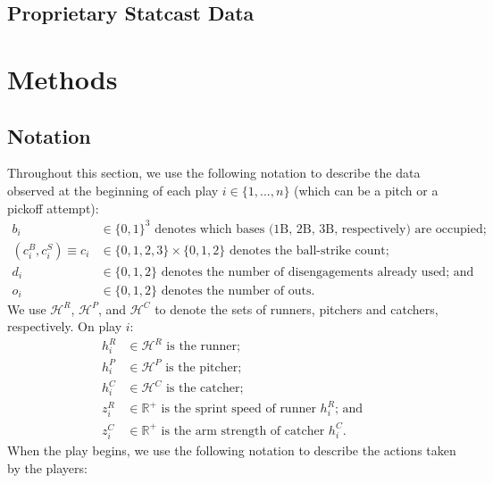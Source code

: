 \documentclass{article}
\begin{document}
    \subsection{Proprietary Statcast Data}

  \section{Methods}

    \subsection{Notation}

    Throughout this section, we use the following notation to describe the data observed at the beginning of each play $i \in \{1, ..., n\}$ (which can be a pitch or a pickoff attempt):
    \begin{align*}
      b_i & \in \{0, 1\}^3 \mbox{ denotes which bases (1B, 2B, 3B, respectively) are occupied;}\\
      (c_i^B, c_i^S) \equiv c_i & \in \{0, 1, 2, 3\} \times \{0, 1, 2\} \mbox{ denotes the ball-strike count;}\\
      d_i & \in \{0, 1, 2\} \mbox{ denotes the number of disengagements already used; and}\\
      o_i & \in \{0, 1, 2\} \mbox{ denotes the number of outs.}
    \end{align*}
    We use $\mathcal{H}^R$, $\mathcal{H}^P$, and $\mathcal{H}^C$ to denote the sets of runners, pitchers and catchers, respectively. On play $i$:
    \begin{align*}
      h_i^R & \in \mathcal{H}^R \mbox{ is the runner;}\\
      h_i^P & \in \mathcal{H}^P \mbox{ is the pitcher;}\\
      h_i^C & \in \mathcal{H}^C \mbox{ is the catcher;}\\
      z_i^R & \in \mathbb{R^+} \mbox{ is the sprint speed of runner $h_i^R$; and}\\
      z_i^C & \in \mathbb{R^+} \mbox{ is the arm strength of catcher $h_i^C$.}
    \end{align*}
    When the play begins, we use the following notation to describe the actions taken by the players:
\end{document}
